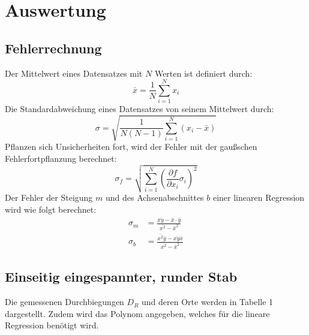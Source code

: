\section{Auswertung}
\label{sec:Auswertung}
\subsection{Fehlerrechnung}
Der Mittelwert eines Datensatzes mit $N$ Werten ist definiert durch:
\begin{equation}
  \bar{x} = \frac{1}{N} \sum_{i=1}^N x_i
\end{equation}
Die Standardabweichung eines Datensatzes von seinem Mittelwert durch:
\begin{equation}
  \sigma = \sqrt{\frac{1}{N(N-1)} \sum_{i=1}^N (x_i - \bar{x})}
\end{equation}
Pflanzen sich Unsicherheiten fort, wird der Fehler mit der gaußschen
Fehlerfortpflanzung berechnet:
\begin{equation}
  \sigma_f = \sqrt{
      \sum\limits_{i = 1}^N
       \left( \frac{\partial f}{\partial x_i} \sigma_i \right)^{\!\! 2}
     }
\end{equation}
Der Fehler der Steigung $m$ und des Achsenabschnittes $b$ einer linearen Regression
wird wie folgt berechnet:
\begin{align}
  \sigma_m &= \frac{\overline{xy}-\bar{x}\cdot\bar{y}}{\bar{x^2}-\bar{x}^2} \\
  \sigma_b &= \frac{\bar{x^2}\bar{y}-\overline{xy}\bar{x}}{\bar{x^2}-\bar{x}^2}
\end{align}

\subsection{Einseitig eingespannter, runder Stab}
Die gemessenen Durchbiegungen $D_R$ und deren Orte werden in Tabelle 1 dargestellt. Zudem wird
das Polynom angegeben, welches für die lineare Regression benötigt wird.

